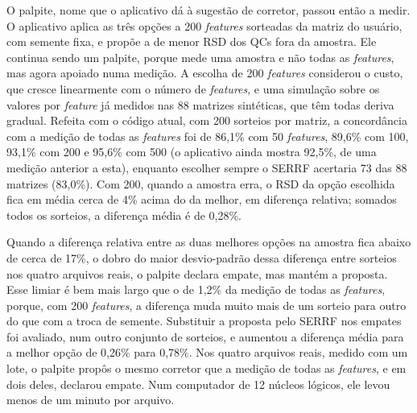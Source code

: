 O palpite, nome que o aplicativo dá à sugestão de corretor, passou então a medir. O aplicativo aplica as três opções a 200 \emph{features} sorteadas da matriz do usuário, com semente fixa, e propõe a de menor RSD dos QCs fora da amostra. Ele continua sendo um palpite, porque mede uma amostra e não todas as \emph{features}, mas agora apoiado numa medição. A escolha de 200 \emph{features} considerou o custo, que cresce linearmente com o número de \emph{features}, e uma simulação sobre os valores por \emph{feature} já medidos nas 88 matrizes sintéticas, que têm todas deriva gradual. Refeita com o código atual, com 200 sorteios por matriz, a concordância com a medição de todas as \emph{features} foi de 86,1\% com 50 \emph{features}, 89,6\% com 100, 93,1\% com 200 e 95,6\% com 500 (o aplicativo ainda mostra 92,5\%, de uma medição anterior a esta), enquanto escolher sempre o SERRF acertaria 73 das 88 matrizes (83,0\%). Com 200, quando a amostra erra, o RSD da opção escolhida fica em média cerca de 4\% acima do da melhor, em diferença relativa; somados todos os sorteios, a diferença média é de 0,28\%.

Quando a diferença relativa entre as duas melhores opções na amostra fica abaixo de cerca de 17\%, o dobro do maior desvio-padrão dessa diferença entre sorteios nos quatro arquivos reais, o palpite declara empate, mas mantém a proposta. Esse limiar é bem mais largo que o de 1,2\% da medição de todas as \emph{features}, porque, com 200 \emph{features}, a diferença muda muito mais de um sorteio para outro do que com a troca de semente. Substituir a proposta pelo SERRF nos empates foi avaliado, num outro conjunto de sorteios, e aumentou a diferença média para a melhor opção de 0,26\% para 0,78\%. Nos quatro arquivos reais, medido com um lote, o palpite propôs o mesmo corretor que a medição de todas as \emph{features}, e em dois deles, declarou empate. Num computador de 12 núcleos lógicos, ele levou menos de um minuto por arquivo.

